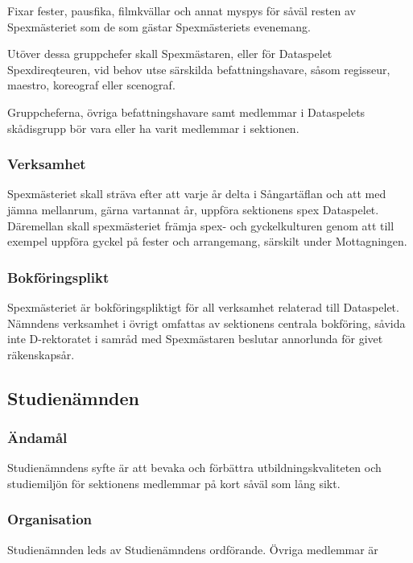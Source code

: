 \documentclass{dgovdoc}
\begin{document}
Fixar fester, pausfika, filmkvällar och annat myspys för såväl resten av Spexmästeriet som de som gästar Spexmästeriets evenemang.

Utöver dessa gruppchefer skall Spexmästaren, eller för Dataspelet Spexdireqteuren, vid behov utse särskilda befattningshavare, såsom regisseur, maestro, koreograf eller scenograf.

Gruppcheferna, övriga befattningshavare samt medlemmar i Dataspelets skådisgrupp bör vara eller ha varit medlemmar i sektionen.

\subsubsection{Verksamhet}

Spexmästeriet skall sträva efter att varje år delta i Sångartäflan och att med jämna mellanrum, gärna vartannat år, uppföra sektionens spex Dataspelet. Däremellan skall spexmästeriet främja spex- och gyckelkulturen genom att till exempel uppföra gyckel på fester och arrangemang, särskilt under Mottagningen.

\subsubsection{Bokföringsplikt}

Spexmästeriet är bokföringspliktigt för all verksamhet relaterad till Dataspelet. Nämndens verksamhet i övrigt omfattas av sektionens centrala bokföring, såvida inte D-rektoratet i samråd med Spexmästaren beslutar annorlunda för givet räkenskapsår.

\subsection{Studienämnden}

\subsubsection{Ändamål}

Studienämndens syfte är att bevaka och förbättra utbildningskvaliteten och studiemiljön för sektionens medlemmar på kort såväl som lång sikt.

\subsubsection{Organisation}

Studienämnden leds av Studienämndens ordförande. Övriga medlemmar är
\end{document}
